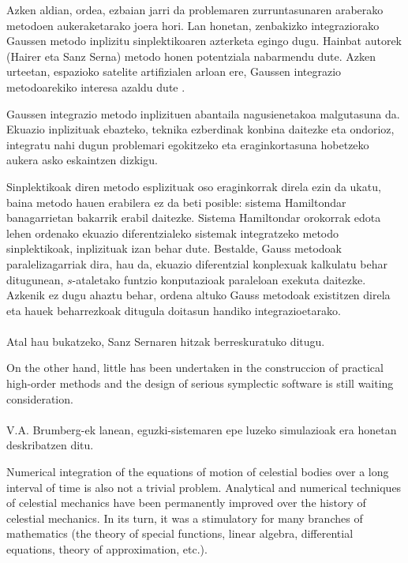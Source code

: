 Azken aldian, ordea, ezbaian jarri da problemaren zurruntasunaren araberako metodoen aukeraketarako joera hori. Lan honetan, zenbakizko integraziorako Gaussen metodo inplizitu sinplektikoaren azterketa egingo dugu. Hainbat autorek (Hairer \cite{Hairer2006,Hairer2008} eta Sanz Serna\cite{JMSanz-Serna1994}) metodo honen potentziala nabarmendu dute. Azken urteetan, espazioko satelite artifizialen arloan ere, Gaussen integrazio metodoarekiko interesa azaldu dute \cite{Bradley2014,Beylkin2014}. 

Gaussen integrazio metodo inplizituen abantaila nagusienetakoa malgutasuna da. Ekuazio inplizituak ebazteko, teknika ezberdinak konbina daitezke eta ondorioz, integratu nahi dugun problemari egokitzeko eta eraginkortasuna hobetzeko aukera asko eskaintzen dizkigu.

Sinplektikoak diren metodo esplizituak oso eraginkorrak direla ezin da ukatu, baina metodo hauen erabilera ez da beti posible: sistema Hamiltondar banagarrietan bakarrik erabil daitezke. Sistema Hamiltondar orokorrak edota lehen ordenako ekuazio diferentzialeko sistemak integratzeko metodo sinplektikoak, inplizituak izan behar dute. Bestalde, Gauss metodoak paralelizagarriak dira, hau da, ekuazio diferentzial konplexuak kalkulatu behar ditugunean, $s$-ataletako funtzio konputazioak paraleloan exekuta daitezke. Azkenik ez dugu ahaztu behar, ordena altuko Gauss metodoak existitzen direla  eta hauek beharrezkoak ditugula doitasun handiko integrazioetarako.     

\paragraph*{}Atal hau bukatzeko, Sanz Sernaren  \cite[1992]{Sanz-Serna1992} hitzak berreskuratuko ditugu. 
\begin{displayquote}
On the other hand, little has been undertaken in the construccion of practical high-order methods and the design of serious symplectic software is still waiting consideration.
\end{displayquote}

\paragraph*{} V.A. Brumberg-ek \cite[2012]{Brumberg2013} lanean, eguzki-sistemaren epe luzeko simulazioak era honetan deskribatzen ditu.
\begin{displayquote}
Numerical integration of the equations of motion of celestial bodies over a long interval of time is also not a trivial problem. Analytical and numerical techniques of celestial mechanics have been permanently improved over the history of celestial mechanics. In its turn, it was a stimulatory for many branches of mathematics (the theory of special functions, linear algebra, differential equations, theory of approximation, etc.).
\end{displayquote}  

